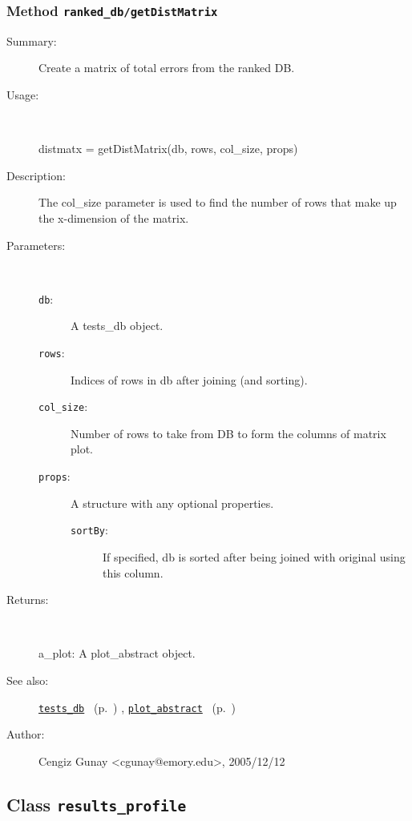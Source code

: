 \subsubsection[Method \texttt{getDistMatrix}]{Method \texttt{ranked\_db/getDistMatrix}}%
%
\label{ref_ranked_db__getDistMatrix}%
\hypertarget{ref_ranked_db__getDistMatrix}{}%
\begin{description}
\item[Summary:]Create a matrix of total errors from the ranked DB.
%
\item[Usage:]~%
\begin{lyxcode}%
distmatx = getDistMatrix(db, rows, col\_size, props)
%
\end{lyxcode}%
%
\item[Description:]%
The col\_size parameter is used to find the number of rows that make up the 
 x-dimension of the matrix.
\item[Parameters:]~
\begin{description}%
\item[\texttt{db}:]
 A tests\_db object.
\item[\texttt{rows}:]
 Indices of rows in db after joining (and sorting).
\item[\texttt{col\_size}:]
 Number of rows to take from DB to form the columns of matrix plot.
\item[\texttt{props}:]
 A structure with any optional properties.
\begin{description}%
\item[\texttt{sortBy}:]
 If specified, db is sorted after being joined with original using this column.
\end{description}%
\end{description}%
%
\item[Returns:]~

	a\_plot: A plot\_abstract object.
%
%
\item[See also:]%
\hyperlink{ref_tests_db}{\texttt{tests\_db}}%
\ (p.~\pageref{ref_tests_db})%
%
, \hyperlink{ref_plot_abstract}{\texttt{plot\_abstract}}%
\ (p.~\pageref{ref_plot_abstract})%
%
%
\item[Author:]%
Cengiz Gunay <cgunay@emory.edu>, 2005/12/12%
\end{description}
\methodline%
\subsection{Class \texttt{results\_profile}}%
%
\label{ref_results_profile}%
\hypertarget{ref_results_profile}{}%
